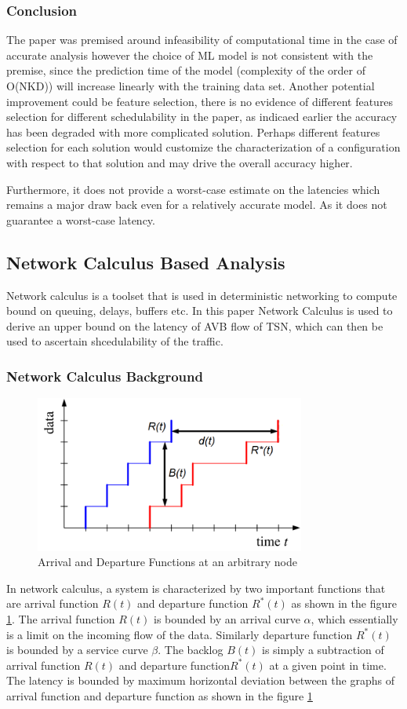 \documentclass[journal,12pt,twocolumn]{IEEEtran}
\begin{document}
\subsubsection{Conclusion}
The paper was premised around infeasibility of computational time in the case of accurate analysis however the choice of ML model is not consistent with the premise, since the prediction time of the model (complexity of the order of O(NKD)) will increase linearly with the training data set.
Another potential improvement could be feature selection, there is no evidence of different features selection for different schedulability in the paper, as indicaed earlier the accuracy has been degraded with more complicated solution. Perhaps different features selection for each solution would customize the characterization of a configuration with respect to that solution and may drive the overall accuracy higher.

Furthermore, it does not provide a worst-case estimate on the latencies which remains a major draw back even for a relatively accurate model. As it does not guarantee a worst-case latency.

\subsection {Network Calculus Based Analysis}
Network calculus is a toolset that is used in deterministic networking to compute bound on queuing, delays, buffers etc. In this paper \cite{NC} Network Calculus is used to derive an upper bound on the latency of AVB flow of TSN, which can then be used to ascertain shcedulability of the traffic.
\subsubsection {Network Calculus Background}
\begin{figure}
\centering
\includegraphics[width=3.5in]{NC_Background}
\caption{Arrival and Departure Functions at an arbitrary node}
\label{NC_Background}
\end{figure}
In network calculus, a system is characterized by two important functions that are arrival function $R(t)$ and departure function $R^*(t)$ as shown in the figure \ref{NC_Background}. The arrival function $R(t)$ is bounded by an arrival curve $\alpha$, which essentially is a limit on the incoming flow of the data. Similarly departure function $R^*(t)$ is bounded by a service curve $\beta$. The backlog $B(t)$ is simply a subtraction of arrival function $R(t)$ and departure function$ R^*(t)$  at a given point in time. The latency is bounded by maximum horizontal deviation between the graphs of arrival function and departure function as shown in the figure \ref{NC_Background}
\end{document}
